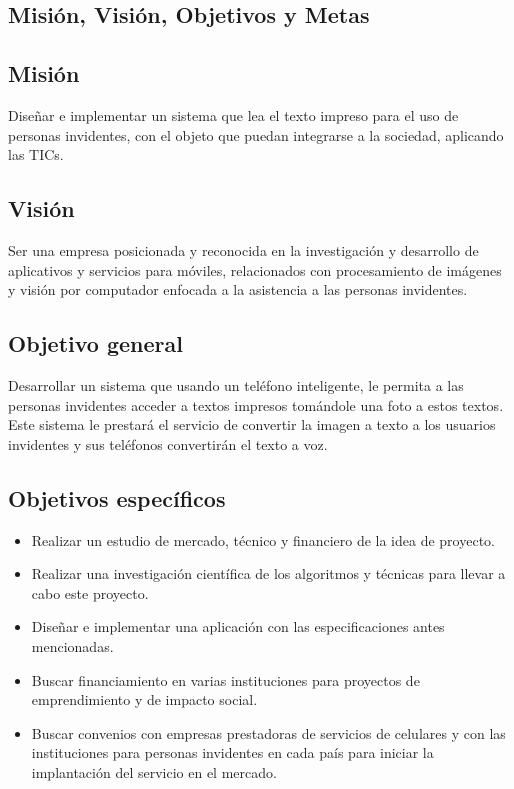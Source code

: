 \documentclass[a4paper, 12pt, oneside]{article}
\begin{document}
	\begin{center}
	\section{Misión, Visión, Objetivos y Metas}
	\end{center}
	
	\subsection{Misión}
	Diseñar e implementar un sistema que lea el texto impreso para el uso de personas invidentes, con el objeto que puedan integrarse a la sociedad, aplicando las TICs.
	
	\subsection{Visión}
	Ser una empresa posicionada y reconocida en la investigación y desarrollo de aplicativos y servicios
	para móviles, relacionados con procesamiento de imágenes y visión por computador enfocada a la 
	asistencia a las personas invidentes.
	
	\subsection{Objetivo general}
	Desarrollar un sistema que usando un teléfono inteligente, le permita a las personas invidentes acceder
	a textos impresos tomándole una foto a estos textos. Este sistema le prestará el servicio de convertir
	la imagen a texto a los usuarios invidentes y sus teléfonos convertirán el texto a voz.
	
	\subsection{Objetivos específicos}
	\begin{itemize}
	\item Realizar un estudio de mercado, técnico y financiero de la idea de proyecto.
	\item Realizar una investigación científica de los algoritmos y técnicas para llevar a cabo este proyecto.
	\item Diseñar e implementar una aplicación con las especificaciones antes mencionadas.
	\item Buscar financiamiento en varias instituciones para proyectos de emprendimiento y
	 de impacto social.
	\item Buscar convenios con empresas prestadoras de servicios de celulares y con las instituciones
	 para personas invidentes en cada país para iniciar la implantación del servicio en el mercado.
	\end{itemize}
	
\end{document}

